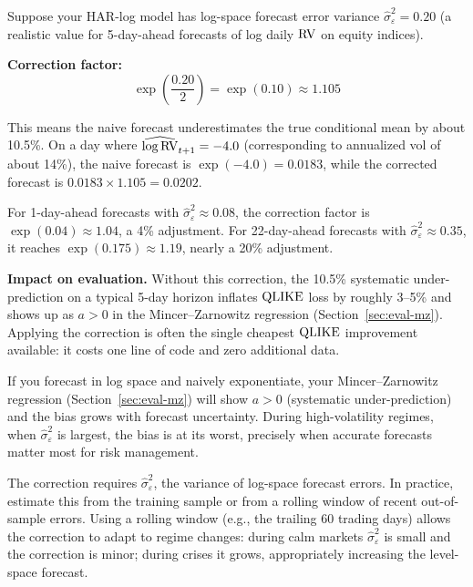 \begin{workedexample}
Suppose your HAR-log model has log-space forecast error variance $\hat{\sigma}^2_\varepsilon = 0.20$ (a realistic value for 5-day-ahead forecasts of log daily $\operatorname{RV}$ on equity indices).

\textbf{Correction factor:}
\[
\exp\!\left(\frac{0.20}{2}\right) = \exp(0.10) \approx 1.105
\]

This means the naive forecast underestimates the true conditional mean by about 10.5\%.
On a day where $\widehat{\log \operatorname{RV}}_{t+1} = -4.0$ (corresponding to annualized vol of about 14\%), the naive forecast is $\exp(-4.0) = 0.0183$, while the corrected forecast is $0.0183 \times 1.105 = 0.0202$.

For 1-day-ahead forecasts with $\hat{\sigma}^2_\varepsilon \approx 0.08$, the correction factor is $\exp(0.04) \approx 1.04$, a 4\% adjustment.
For 22-day-ahead forecasts with $\hat{\sigma}^2_\varepsilon \approx 0.35$, it reaches $\exp(0.175) \approx 1.19$, nearly a 20\% adjustment.

\textbf{Impact on evaluation.}
Without this correction, the 10.5\% systematic under-prediction on a typical 5-day horizon inflates $\operatorname{QLIKE}$ loss by roughly 3--5\% and shows up as $a > 0$ in the Mincer--Zarnowitz regression (Section~\ref{sec:eval-mz}).
Applying the correction is often the single cheapest $\operatorname{QLIKE}$ improvement available: it costs one line of code and zero additional data.
\end{workedexample}

\begin{warning}
If you forecast in log space and naively exponentiate, your Mincer--Zarnowitz regression (Section~\ref{sec:eval-mz}) will show $a > 0$ (systematic under-prediction) and the bias grows with forecast uncertainty.
During high-volatility regimes, when $\hat{\sigma}^2_\varepsilon$ is largest, the bias is at its worst, precisely when accurate forecasts matter most for risk management.
\end{warning}

\begin{keyidea}
The correction requires $\hat{\sigma}^2_\varepsilon$, the variance of log-space forecast errors.
In practice, estimate this from the training sample or from a rolling window of recent out-of-sample errors.
Using a rolling window (e.g., the trailing 60 trading days) allows the correction to adapt to regime changes: during calm markets $\hat{\sigma}^2_\varepsilon$ is small and the correction is minor; during crises it grows, appropriately increasing the level-space forecast.
\end{keyidea}

